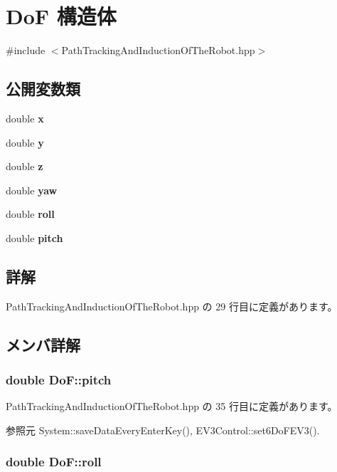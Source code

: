\section{Do\-F 構造体}
\label{struct_do_f}


{\ttfamily \#include $<$Path\-Tracking\-And\-Induction\-Of\-The\-Robot.\-hpp$>$}

\subsection*{公開変数類}
\begin{DoxyCompactItemize}
\item 
double {\bf x}
\item 
double {\bf y}
\item 
double {\bf z}
\item 
double {\bf yaw}
\item 
double {\bf roll}
\item 
double {\bf pitch}
\end{DoxyCompactItemize}


\subsection{詳解}


 Path\-Tracking\-And\-Induction\-Of\-The\-Robot.\-hpp の 29 行目に定義があります。



\subsection{メンバ詳解}
\subsubsection[{pitch}]{\setlength{\rightskip}{0pt plus 5cm}double Do\-F\-::pitch}\label{struct_do_f_aafd25e3441a352a3feaa072fe58c61ab}


 Path\-Tracking\-And\-Induction\-Of\-The\-Robot.\-hpp の 35 行目に定義があります。



参照元 System\-::save\-Data\-Every\-Enter\-Key(), E\-V3\-Control\-::set6\-Do\-F\-E\-V3().

\subsubsection[{roll}]{\setlength{\rightskip}{0pt plus 5cm}double Do\-F\-::roll}\label{struct_do_f_ae281b05a1f55ab36e1648638d5de595c}


